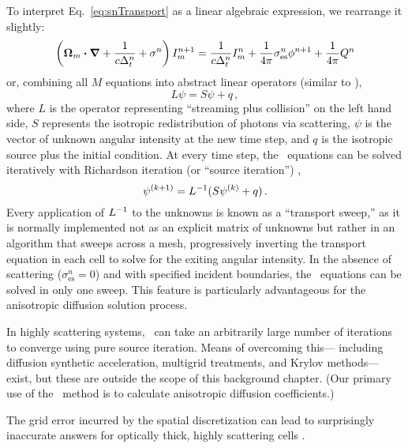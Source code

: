 To interpret Eq.~\eqref{eq:snTransport} as a linear algebraic expression, we
rearrange it slightly:
\begin{equation*}
  \left( \bm{\Omega}_{m} \bm{\cdot} \bm{\nabla} + \frac{1}{c\Delta_t^n}
  + \sigma^n \right) I_{m}^{n+1}
  = \frac{1}{c\Delta_t^n} I_{m}^n
  + \frac{1}{4\pi} \sigma_\mathrm{es}^n \phi^{n+1}
  + \frac{1}{4\pi} Q^n
\end{equation*}
or, combining all $M$ equations into abstract linear operators (similar to
\cite{War2004}),
\begin{equation*}
  L \psi = S \psi + q\,,
\end{equation*}
where $L$ is the operator representing ``streaming plus collision'' on the left
hand side, $S$ represents the isotropic redistribution of photons via
scattering, $\psi$ is the vector of unknown angular intensity at the new time
step, and $q$ is the isotropic source plus the initial condition. At every time
step, the \SN\ equations can be solved iteratively with Richardson
iteration (or ``source iteration'') \cite{Lew1984},
\begin{equation*}
  \psi^{(k+1)} = L^{-1} ( S \psi^{(k)} + q )\,.
\end{equation*}
Every application of $L^{-1}$ to the unknowns is known as a ``transport sweep,''
as it is normally implemented not as an explicit matrix of unknowns but rather in
an algorithm that sweeps across a mesh, progressively inverting the transport
equation in each cell to solve for the exiting angular intensity.
In the absence of scattering ($\sigma_\mathrm{es}^n=0$) and with specified
incident boundaries,
the \SN\ equations can be solved in only one sweep. This feature is particularly
advantageous for the anisotropic diffusion solution process.

In highly scattering systems, \SN\ can take an arbitrarily large number of
iterations to converge
using pure source iteration. Means of overcoming this---%
including diffusion
synthetic acceleration, multigrid treatments, and Krylov methods---%
exist, but these are
outside the scope of this background chapter. (Our primary use of the \SN\ method
is to calculate anisotropic diffusion coefficients.)

The grid error incurred by the spatial discretization can lead to surprisingly
inaccurate answers for optically thick, highly scattering cells
\cite{Ada1998a,Ada2001}.

